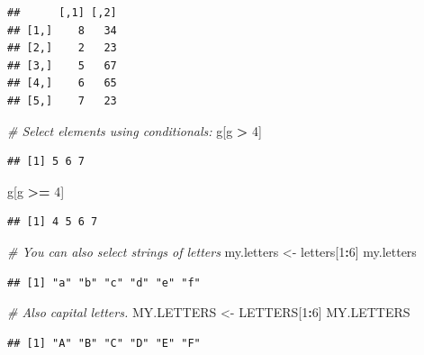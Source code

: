 \documentclass[
]{article}
\newenvironment{Shaded}{\begin{snugshade}}{\end{snugshade}}
\newcommand{\CommentTok}[1]{\textcolor[rgb]{0.56,0.35,0.01}{\textit{#1}}}
\newcommand{\DecValTok}[1]{\textcolor[rgb]{0.00,0.00,0.81}{#1}}
\newcommand{\NormalTok}[1]{#1}
\newcommand{\OperatorTok}[1]{\textcolor[rgb]{0.81,0.36,0.00}{\textbf{#1}}}
\newcommand{\StringTok}[1]{\textcolor[rgb]{0.31,0.60,0.02}{#1}}
\begin{document}
\begin{verbatim}
##      [,1] [,2]
## [1,]    8   34
## [2,]    2   23
## [3,]    5   67
## [4,]    6   65
## [5,]    7   23
\end{verbatim}

\begin{Shaded}
\begin{Highlighting}[]
\CommentTok{# Select elements using conditionals:}
\NormalTok{g[g }\OperatorTok{>}\StringTok{ }\DecValTok{4}\NormalTok{]}
\end{Highlighting}
\end{Shaded}

\begin{verbatim}
## [1] 5 6 7
\end{verbatim}

\begin{Shaded}
\begin{Highlighting}[]
\NormalTok{g[g }\OperatorTok{>=}\StringTok{ }\DecValTok{4}\NormalTok{]}
\end{Highlighting}
\end{Shaded}

\begin{verbatim}
## [1] 4 5 6 7
\end{verbatim}

\begin{Shaded}
\begin{Highlighting}[]
\CommentTok{# You can also select strings of letters}
\NormalTok{my.letters <-}\StringTok{ }\NormalTok{letters[}\DecValTok{1}\OperatorTok{:}\DecValTok{6}\NormalTok{]}
\NormalTok{my.letters}
\end{Highlighting}
\end{Shaded}

\begin{verbatim}
## [1] "a" "b" "c" "d" "e" "f"
\end{verbatim}

\begin{Shaded}
\begin{Highlighting}[]
\CommentTok{# Also capital letters.}
\NormalTok{MY.LETTERS <-}\StringTok{ }\NormalTok{LETTERS[}\DecValTok{1}\OperatorTok{:}\DecValTok{6}\NormalTok{]}
\NormalTok{MY.LETTERS}
\end{Highlighting}
\end{Shaded}

\begin{verbatim}
## [1] "A" "B" "C" "D" "E" "F"
\end{verbatim}
\end{document}
